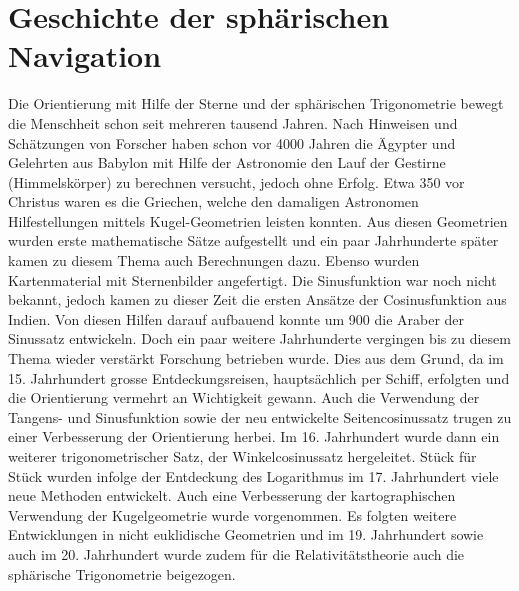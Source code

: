 \documentclass[12pt]{scrartcl}
\begin{document}
\section{Geschichte der sphärischen Navigation}
Die Orientierung mit Hilfe der Sterne und der sphärischen Trigonometrie bewegt die Menschheit schon seit mehreren tausend Jahren. 
Nach Hinweisen und Schätzungen von Forscher haben schon vor 4000 Jahren die Ägypter und Gelehrten aus Babylon mit Hilfe der Astronomie den Lauf der Gestirne (Himmelskörper) zu berechnen versucht, jedoch ohne Erfolg. 
Etwa 350 vor Christus waren es die Griechen, welche den damaligen Astronomen Hilfestellungen mittels Kugel-Geometrien leisten konnten. 
Aus diesen Geometrien wurden erste mathematische Sätze aufgestellt und ein paar Jahrhunderte später kamen zu diesem Thema auch Berechnungen dazu. 
Ebenso wurden Kartenmaterial mit Sternenbilder angefertigt. 
Die Sinusfunktion war noch nicht bekannt, jedoch kamen zu dieser Zeit die ersten Ansätze der Cosinusfunktion aus Indien. 
Von diesen Hilfen darauf aufbauend konnte um 900 die Araber der Sinussatz entwickeln. 
Doch ein paar weitere Jahrhunderte vergingen bis zu diesem Thema wieder verstärkt Forschung betrieben wurde. 
Dies aus dem Grund, da im 15. Jahrhundert grosse Entdeckungsreisen, hauptsächlich per Schiff, erfolgten und die Orientierung vermehrt an Wichtigkeit gewann. 
Auch die Verwendung der Tangens- und Sinusfunktion sowie der neu entwickelte Seitencosinussatz trugen zu einer Verbesserung der Orientierung herbei. 
Im 16. Jahrhundert wurde dann ein weiterer trigonometrischer Satz, der Winkelcosinussatz hergeleitet. Stück für Stück wurden infolge der Entdeckung des Logarithmus im 17. Jahrhundert viele neue Methoden entwickelt. 
Auch eine Verbesserung der kartographischen Verwendung der Kugelgeometrie wurde vorgenommen.  
Es folgten weitere Entwicklungen in nicht euklidische Geometrien und im 19. Jahrhundert sowie auch im 20. Jahrhundert wurde zudem für die Relativitätstheorie auch die sphärische Trigonometrie beigezogen.
\end{document}
